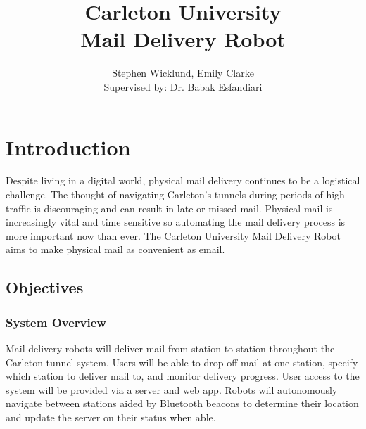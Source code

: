 \documentclass[12pt]{report}
\begin{document}
    
    \title{Carleton University
    \\ Mail Delivery Robot}
    \author{Stephen Wicklund, Emily Clarke \\{\small Supervised by: Dr. Babak Esfandiari}}
     \copyrightfalse %

    \beforepreface



    \prefaceTOC   %
    \prefaceLOF   %
    \prefaceLOT   %



\endpreface
	
%

\chapter{Introduction}
Despite living in a digital world, physical mail delivery continues to be a logistical challenge. The thought of navigating Carleton's tunnels during periods of high traffic is discouraging and can result in late or missed mail. Physical mail is increasingly vital and time sensitive so automating the mail delivery process is more important now than ever. The Carleton University Mail Delivery Robot aims to make physical mail as convenient as email.

\section{Objectives}
\subsection{System Overview}
Mail delivery robots will deliver mail from station to station throughout the Carleton tunnel system. Users will be able to drop off mail at one station, specify which station to deliver mail to, and monitor delivery progress. User access to the system will be provided via a server and web app. Robots will autonomously navigate between stations aided by Bluetooth beacons to determine their location and update the server on their status when able.
\end{document}
